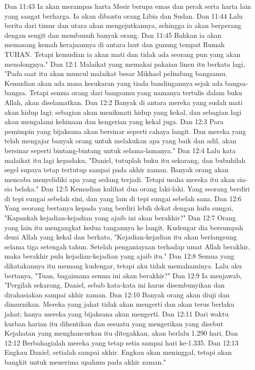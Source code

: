 Dan 11:43  Ia akan merampas harta Mesir berupa emas dan perak serta harta lain yang sangat berharga. Ia akan dibantu orang Libia dan Sudan.
Dan 11:44  Lalu berita dari timur dan utara akan mengejutkannya, sehingga ia akan berperang dengan sengit dan membunuh banyak orang.
Dan 11:45  Bahkan ia akan memasang kemah kerajaannya di antara laut dan gunung tempat Rumah TUHAN. Tetapi kemudian ia akan mati dan tidak ada seorang pun yang akan menolongnya."
Dan 12:1  Malaikat yang memakai pakaian linen itu berkata lagi, "Pada saat itu akan muncul malaikat besar Mikhael pelindung bangsamu. Kemudian akan ada masa kesukaran yang tiada bandingannya sejak ada bangsa-bangsa. Tetapi semua orang dari bangsamu yang namanya tertulis dalam buku Allah, akan diselamatkan.
Dan 12:2  Banyak di antara mereka yang sudah mati akan hidup lagi; sebagian akan menikmati hidup yang kekal, dan sebagian lagi akan mengalami kehinaan dan kengerian yang kekal juga.
Dan 12:3  Para pemimpin yang bijaksana akan bersinar seperti cahaya langit. Dan mereka yang telah mengajar banyak orang untuk melakukan apa yang baik dan adil, akan bersinar seperti bintang-bintang untuk selama-lamanya."
Dan 12:4  Lalu kata malaikat itu lagi kepadaku, "Daniel, tutuplah buku itu sekarang, dan bubuhilah segel supaya tetap tertutup sampai pada akhir zaman. Banyak orang akan mencoba menyelidiki apa yang sedang terjadi. Tetapi usaha mereka itu akan sia-sia belaka."
Dan 12:5  Kemudian kulihat dua orang laki-laki. Yang seorang berdiri di tepi sungai sebelah sini, dan yang lain di tepi sungai sebelah sana.
Dan 12:6  Yang seorang bertanya kepada yang berdiri lebih dekat dengan hulu sungai, "Kapankah kejadian-kejadian yang ajaib ini akan berakhir?"
Dan 12:7  Orang yang lain itu mengangkat kedua tangannya ke langit. Kudengar dia bersumpah demi Allah yang kekal dan berkata, "Kejadian-kejadian itu akan berlangsung selama tiga setengah tahun. Setelah penganiayaan terhadap umat Allah berakhir, maka berakhir pula kejadian-kejadian yang ajaib itu."
Dan 12:8  Semua yang dikatakannya itu memang kudengar, tetapi aku tidak memahaminya. Lalu aku bertanya, "Tuan, bagaimana semua ini akan berakhir?"
Dan 12:9  Ia menjawab, "Pergilah sekarang, Daniel, sebab kata-kata ini harus disembunyikan dan dirahasiakan sampai akhir zaman.
Dan 12:10  Banyak orang akan diuji dan dimurnikan. Mereka yang jahat tidak akan mengerti dan akan terus berlaku jahat; hanya mereka yang bijaksana akan mengerti.
Dan 12:11  Dari waktu kurban harian itu dihentikan dan sesuatu yang mengerikan yang disebut Kejahatan yang menghancurkan itu ditegakkan, akan berlalu 1.290 hari.
Dan 12:12  Berbahagialah mereka yang tetap setia sampai hari ke-1.335.
Dan 12:13  Engkau Daniel, setialah sampai akhir. Engkau akan meninggal, tetapi akan bangkit untuk menerima upahmu pada akhir zaman."


